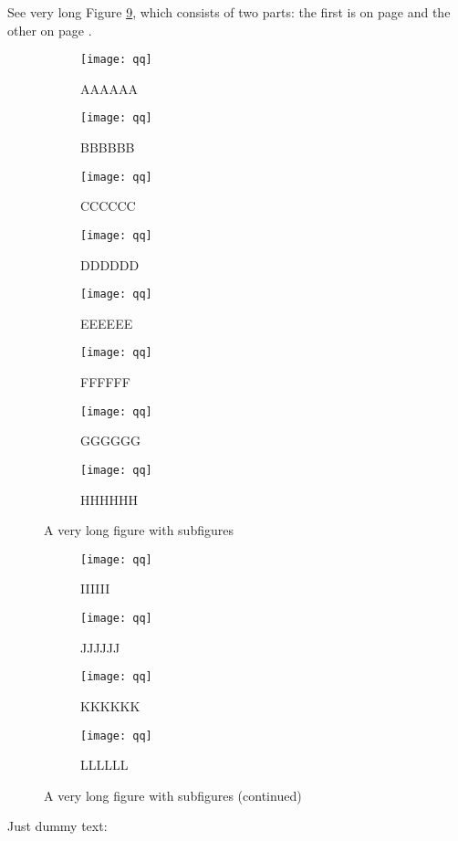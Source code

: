 \documentclass[12pt,a4paper]{article}
\newenvironment{mysubfig}
{\begin{subfigure}{0.5\linewidth}\centering}
{\end{subfigure}}
\begin{document}
See very long Figure \ref{fig:long}, which consists of two parts:
the first is on page \pageref{fig:A} and the other on page \pageref{fig:I}.

\begin{figure}[!b]
  \begin{mysubfig} %
     \texttt{[image: qq]}
     \caption{AAAAAA}\label{fig:A}
  \end{mysubfig} 
  \begin{mysubfig}   %
     \texttt{[image: qq]}
     \caption{BBBBBB}\label{fig:B}
  \end{mysubfig} 
  \begin{mysubfig}   %
     \texttt{[image: qq]}
     \caption{CCCCCC}\label{fig:C}
  \end{mysubfig} 
  \begin{mysubfig}   %
     \texttt{[image: qq]}
     \caption{DDDDDD}\label{fig:D}
  \end{mysubfig} 
  \begin{mysubfig}   %
     \texttt{[image: qq]}
     \caption{EEEEEE}\label{fig:E}
  \end{mysubfig} 
  \begin{mysubfig}   %
     \texttt{[image: qq]}
     \caption{FFFFFF}\label{fig:F}
  \end{mysubfig} 
  \begin{mysubfig}   %
     \texttt{[image: qq]}
     \caption{GGGGGG}\label{fig:G}
  \end{mysubfig} 
  \begin{mysubfig}   %
     \texttt{[image: qq]}
     \caption{HHHHHH}\label{fig:H}
     \end{mysubfig} 
  \caption{A very long figure with subfigures}\label{fig:long}
\end{figure}


\begin{figure}[!t] \ContinuedFloat %
  \begin{mysubfig}   %
     \texttt{[image: qq]}
     \caption{IIIIII}\label{fig:I}
  \end{mysubfig} 
  \begin{mysubfig}   %
     \texttt{[image: qq]}
     \caption{JJJJJJ}\label{fig:J}
  \end{mysubfig} 
  \begin{mysubfig}   %
     \texttt{[image: qq]}
     \caption{KKKKKK}\label{fig:K}
  \end{mysubfig} 
  \begin{mysubfig}   %
     \texttt{[image: qq]}
     \caption{LLLLLL}\label{fig:L}
  \end{mysubfig} 
  \caption{A very long figure with subfigures (continued)} %
\end{figure}

Just dummy text: \lipsum[1-2]


\end{document}
